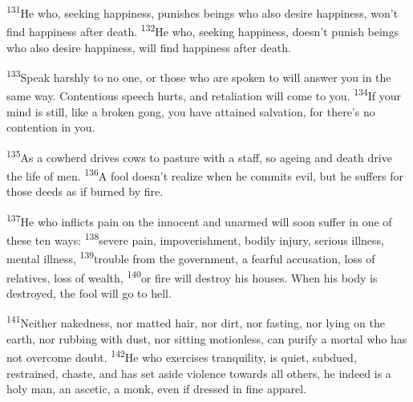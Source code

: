 \documentclass[openany,12pt,english]{book}
\newenvironment{para}{\par\pretolerance=100\tolerance=200\setlength{\emergencystretch}{0.6em}\relax}{\par}
\begin{document}
\begin{para}
    \textsuperscript{131}\thinspace{}He who, seek\-ing hap\-pi\-ness, punishes beings who al\-so de\-sire hap\-pi\-ness, won't find hap\-pi\-ness af\-ter death.
    \textsuperscript{132}\thinspace{}He who, seek\-ing hap\-pi\-ness, does\-n't pun\-ish beings who al\-so de\-sire hap\-pi\-ness, will find hap\-pi\-ness af\-ter death.
\end{para}

\begin{para}
    \textsuperscript{133}\thinspace{}Speak harsh\-ly to no one, or those who are spo\-ken to will an\-swer you in the same way. Con\-ten\-tious speech hurts, and re\-tal\-i\-a\-tion will come to you.
    \textsuperscript{134}\thinspace{}If your mind is still, like a bro\-ken gong, you have attained sal\-va\-tion, for there's no con\-ten\-tion in you.
\end{para}

\begin{para}
    \textsuperscript{135}\thinspace{}As a cow\-herd drives cows to pas\-ture with a staff, so age\-ing and death drive the life of men.
    \textsuperscript{136}\thinspace{}A fool does\-n't re\-al\-ize when he commits evil, but he suffers for those deeds as if burned by fire.
\end{para}

\begin{para}
    \textsuperscript{137}\thinspace{}He who inflicts pain on the in\-no\-cent and un\-armed will soon suf\-fer in one of these ten ways:
    \textsuperscript{138}\thinspace{}se\-vere pain, im\-pov\-er\-ish\-ment, bod\-i\-ly in\-ju\-ry, se\-ri\-ous ill\-ness, men\-tal ill\-ness,
    \textsuperscript{139}\thinspace{}trou\-ble from the gov\-ern\-ment, a fear\-ful ac\-cu\-sa\-tion, loss of relatives, loss of wealth,
    \textsuperscript{140}\thinspace{}or fire will de\-stroy his hous\-es. When his bod\-y is destroyed, the fool will go to hell.
\end{para}

\begin{para}
    \textsuperscript{141}\thinspace{}Nei\-ther na\-ked\-ness, nor mat\-ted hair, nor dirt, nor fasting, nor ly\-ing on the earth, nor rub\-bing with dust, nor sit\-ting mo\-tion\-less, can pu\-ri\-fy a mor\-tal who has not over\-come doubt.
    \textsuperscript{142}\thinspace{}He who exercises tran\-quil\-i\-ty, is qui\-et, sub\-dued, restrained, chaste, and has set a\-side vi\-o\-lence to\-wards all others, he in\-deed is a ho\-ly man, an as\-cet\-ic, a monk, e\-ven if dressed in fi\-ne ap\-par\-el.
\end{para}
\end{document}
